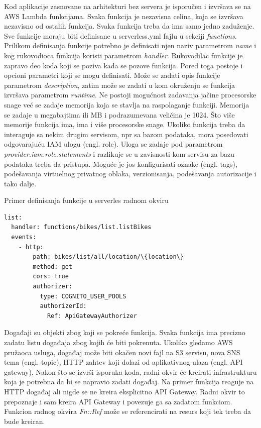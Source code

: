 \documentclass[12pt,oneside]{memoir}
\begin{document}
Kod aplikacije zasnovane na arhitekturi bez servera je isporučen i izvršava se na AWS Lambda funkcijama. Svaka funkcija je nezavisna celina, koja se izvršava nezavisno od ostalih funkcija. Svaka funkcija treba da ima samo jedno zaduženje. Sve funkcije moraju biti definisane u serverless.yml fajlu u sekciji \emph{functions}. Prilikom definisanja funkcije potrebno je definisati njen naziv parametrom \emph{name} i kog rukovodioca funkcija koristi parametrom \emph{handler}. Rukovodilac funkcije je zapravo deo koda koji se poziva kada se pozove funkcija. Pored toga postoje i opcioni parametri koji se mogu definisati. Može se zadati opis funkcije parametrom \emph{description}, zatim može se zadati u kom okruženju se funkcija izvršava parametrom \emph{runtime}. Ne postoji mogućnost zadavanja jačine procesorske snage već se zadaje memorija koja se stavlja na raspolaganje funkciji. Memorija se zadaje u megabajtima ili MB i podrazumevana veličina je 1024. Što više memorije funkcija ima, ima i više procesorske snage. Ukoliko funkcija treba da interaguje sa nekim drugim servisom, npr sa bazom podataka, mora posedovati odgovarajuću IAM ulogu (engl. role). Uloga se zadaje pod parametrom \emph{provider.iam.role.statements} i razlikuje se u zavisnosti kom servisu za bazu podataka treba da pristupa. Moguće je jos konfigurisati oznake (engl. tags), podešavanja virtuelnog privatnog oblaka, verzionisanja, podešavanja autorizacije i tako dalje.


\begin{center}Primer definisanja funkcije u serverles radnom okviru\end{center}
\begin{lstlisting}
list:
  handler: functions/bikes/list.listBikes
  events:
    - http:
        path: bikes/list/all/location/\{location\}
        method: get
        cors: true
        authorizer:
          type: COGNITO_USER_POOLS
          authorizerId:
            Ref: ApiGatewayAuthorizer
\end{lstlisting}
 
Događaji su objekti zbog koji se pokreće funkcija. Svaka funkcija ima precizno zadatu listu događaja zbog kojih će biti pokrenuta. Ukoliko gledamo AWS pružaoca usluga, događaj može biti okačen novi fajl na S3 servisu, nova SNS tema (engl. topic), HTTP zahtev koji dolazi od aplikativnog ulaza (engl. API gateway). Nakon što se izvrši isporuka koda, radni okvir će kreirati infrastrukturu koja je potrebna da bi se napravio zadati događaj. Na primer funkcija reaguje na HTTP događaj ali nigde se ne kreira eksplicitno API Gateway. Radni okvir to prepoznaje i sam kreira API Gateway i povezuje ga sa zadatom funkciom. Funkcion radnog okvira \emph{Fn::Ref} može se referencirati na resurs koji tek treba da bude kreiran.
 
\end{document}
